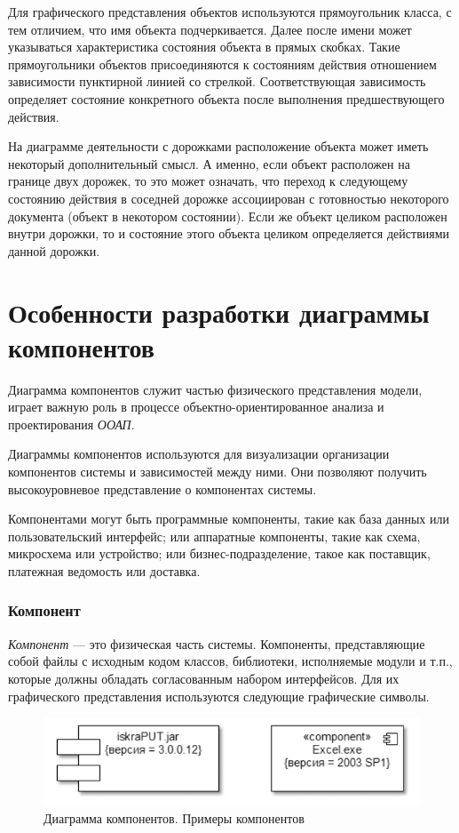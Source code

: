 \documentclass[a4paper,12pt]{extreport}
\begin{document}
Для графического представления объектов	 используются прямоугольник класса, с тем отличием, что имя объекта подчеркивается. Далее после имени может указываться характеристика состояния объекта в прямых скобках. Такие прямоугольники объектов присоединяются к состояниям действия отношением зависимости пунктирной линией со стрелкой. Соответствующая зависимость определяет состояние конкретного объекта после выполнения предшествующего действия.

На диаграмме деятельности с дорожками расположение объекта может иметь некоторый дополнительный смысл. А именно, если объект расположен на границе двух дорожек, то это может означать, что переход к следующему состоянию действия в соседней дорожке ассоциирован с готовностью некоторого документа (объект в некотором состоянии). Если же объект целиком расположен внутри дорожки, то и состояние этого объекта целиком определяется действиями данной дорожки.


\section{Особенности разработки диаграммы компонентов}
Диаграмма компонентов служит частью физического представления модели, играет важную роль в процессе объектно-ориентированное анализа и проектирования \textit{ООАП}. 

Диаграммы компонентов используются для визуализации организации компонентов системы и зависимостей между ними. Они позволяют получить высокоуровневое представление о компонентах системы.

Компонентами могут быть программные компоненты, такие как база данных или пользовательский интерфейс; или аппаратные компоненты, такие как схема, микросхема или устройство; или бизнес-подразделение, такое как поставщик, платежная ведомость или доставка.


\subsubsection*{Компонент}
\textit{Компонент} ---  это физическая часть системы. Компоненты, представляющие собой файлы с исходным кодом классов, библиотеки, исполняемые модули и т.п., которые должны обладать согласованным набором интерфейсов. Для их графического представления используются следующие графические символы. 
\begin{figure}[h!]
	\centering
	\includegraphics[width=0.6\linewidth]{images/components}
	\caption{Диаграмма компонентов. Примеры компонентов}
	\label{fig:components}
\end{figure}
\end{document}
